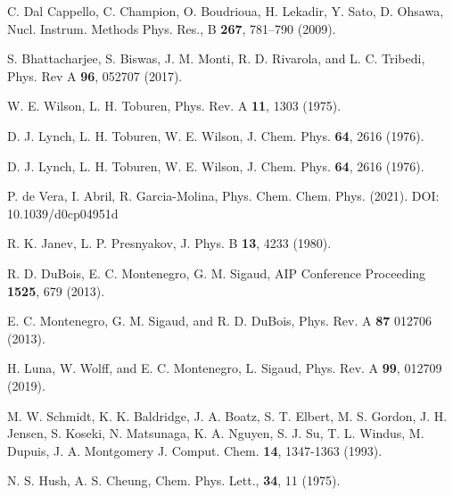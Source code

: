 \begin{thebibliography}{9}
C. Dal Cappello, C. Champion, O. Boudrioua, H. Lekadir, Y. Sato, 
D. Ohsawa, 
Nucl. Instrum. Methods Phys. Res., B \textbf{267}, 781--790 (2009).

S. Bhattacharjee, S. Biswas, J. M. Monti, R. D. Rivarola, and 
L. C. Tribedi,
Phys. Rev A \textbf{96}, 052707 (2017).

W. E. Wilson, L. H. Toburen,
Phys. Rev. A \textbf{11}, 1303 (1975).

D. J. Lynch, L. H. Toburen, W. E. Wilson,
J. Chem. Phys. \textbf{64}, 2616 (1976).

D. J. Lynch, L. H. Toburen, W. E. Wilson,
J. Chem. Phys. \textbf{64}, 2616 (1976).

P. de Vera, I. Abril, R. Garcia-Molina,
Phys. Chem. Chem. Phys. (2021). DOI: 10.1039/d0cp04951d

R. K. Janev, L. P. Presnyakov, 
J. Phys. B \textbf{13}, 4233 (1980).

R. D. DuBois, E. C. Montenegro, G. M. Sigaud,
AIP Conference Proceeding \textbf{1525}, 679 (2013).

E. C. Montenegro, G. M. Sigaud, and R. D. DuBois, 
Phys. Rev. A \textbf{87} 012706 (2013).

H. Luna, W. Wolff, and E. C. Montenegro, L. Sigaud, 
Phys. Rev. A \textbf{99}, 012709 (2019).

M. W. Schmidt, K. K. Baldridge, J. A. Boatz, S. T. Elbert, M. S. Gordon, 
J. H. Jensen, S. Koseki, N. Matsunaga, K. A. Nguyen, S. J. Su, 
T. L. Windus, M. Dupuis, J. A. Montgomery 
J. Comput. Chem. \textbf{14}, 1347-1363 (1993).

N. S. Hush, A. S. Cheung,  
Chem. Phys. Lett., \textbf{34}, 11 (1975).


\end{thebibliography}
